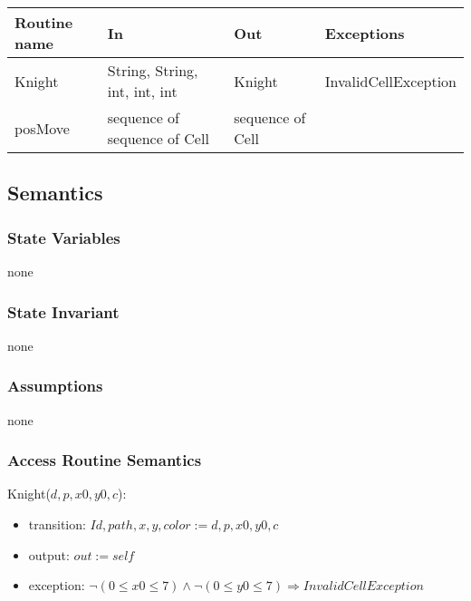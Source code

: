\documentclass[12pt]{article}
\begin{document}
\begin{tabular}{| l | l | l | l |}
\hline
\textbf{Routine name} & \textbf{In} & \textbf{Out} & \textbf{Exceptions}\\
\hline
Knight &String, String, int, int, int & Knight & InvalidCellException\\
\hline
posMove & sequence of sequence of Cell & sequence of Cell & ~\\
\hline
\end{tabular}

\subsection* {Semantics}

\subsubsection* {State Variables}

none

\subsubsection* {State Invariant}

none

\subsubsection* {Assumptions}

none

\subsubsection* {Access Routine Semantics}

Knight($d, p, x0, y0, c$):
\begin{itemize}
\item transition: $Id, path, x, y, color:= d, p, x0, y0, c$
\item output: $out := \mathit{self}$
\item exception: $ \neg (0 \leq x0 \leq 7) \wedge  \neg (0 \leq y0 \leq 7) \Rightarrow InvalidCellException$
\end{itemize}
\end{document}
